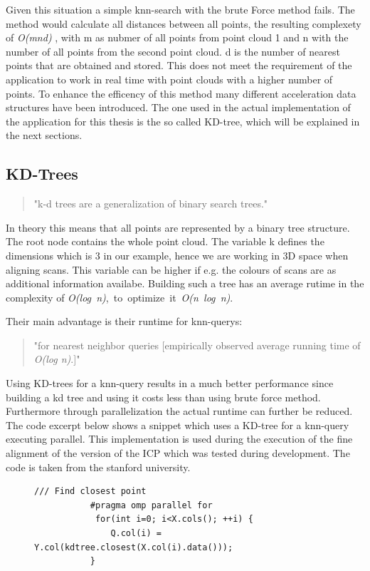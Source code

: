 \documentclass[hyperref,english,bachelorofscience,bibnum]{cgvpub}
\begin{document}
Given this situation a simple knn-search with the brute Force method fails. The method would calculate all distances between all points, the resulting complexety of  \textit{O(mnd)} \cite{Garcia2008}, with m as nubmer of all points from point cloud 1 and n with the number of all points from the second point cloud. d is the number of nearest points that are obtained and stored. This does not meet the requirement of the application to work in real time with point clouds with a higher number of points.
To enhance the efficency of this method many different acceleration data structures have been introduced. The one used in the actual implementation of the application for this thesis is the so called KD-tree, which will be explained in the next sections.

\subsection{KD-Trees}

\begin{quote}
"k-d trees are a generalization of binary search trees."\cite{Nuchter2007}
\end{quote}
In theory this means that all points are represented by a binary tree structure. The root node contains the whole point cloud. The variable k defines the dimensions which is 3 in our example, hence we are working in 3D space when aligning scans. This variable can be higher if e.g. the colours of scans are as additional information availabe.
Building such a tree has an average rutime in the complexity of \mbox{\textit{O(log n)}, to optimize it \textit{O(n log n)}\cite{bentley1975}}.

Their main advantage is their runtime for knn-querys: 
\begin{quote}
"for nearest neighbor queries [empirically observed average running time of \textit{O(log n)}.]" \cite{bentley1975}
\end{quote}
Using KD-trees for a knn-query results in a much better performance since building a kd tree and using it costs less than using brute force method. Furthermore through parallelization the actual runtime can further be reduced. The code excerpt below shows a snippet which uses a KD-tree for a knn-query executing parallel. This implementation is used during the execution of the fine alignment of the version of the ICP which was tested during development. The code is taken from the stanford university. %

\begin{figure}[htbp]
\begin{lstlisting}[frame=trbl]
           /// Find closest point
           #pragma omp parallel for
            for(int i=0; i<X.cols(); ++i) {
               Q.col(i) = Y.col(kdtree.closest(X.col(i).data()));
           }
\end{lstlisting}
\end{figure}
\end{document}
